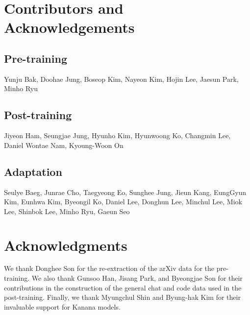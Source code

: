 \clearpage

\let\oldthefootnote\thefootnote
\renewcommand{\thefootnote}{}
\renewcommand{\thefootnote}{\fnsymbol{footnote}}

\section*{Contributors and Acknowledgements}

\subsection*{Pre-training}

Yunju Bak, Doohae Jung, Boseop Kim\footnotemark[2], Nayeon Kim, Hojin Lee, Jaesun Park,  Minho Ryu

\subsection*{Post-training}

Jiyeon Ham, Seungjae Jung, Hyunho Kim, Hyunwoong Ko, Changmin Lee, Daniel Wontae Nam\footnotemark[2], Kyoung-Woon On\footnotemark[2]\footnotemark[3]

\subsection*{Adaptation}

Seulye Baeg, Junrae Cho, Taegyeong Eo, Sunghee Jung, Jieun Kang, EungGyun Kim\footnotemark[2], Eunhwa Kim, Byeongil Ko, Daniel Lee, Donghun Lee, Minchul Lee, Miok Lee, Shinbok Lee, Minho Ryu, Gaeun Seo



\section*{Acknowledgments}
We thank Donghee Son for the re-extraction of the arXiv data for the pre-training. 
We also thank Gunsoo Han, Jisang Park, and Byeongjae Son for their contributions in the construction of the general chat and code data used in the post-training. 
Finally, we thank Myungchul Shin and Byung-hak Kim for their invaluable support for Kanana models.

\renewcommand{\thefootnote}{\oldthefootnote}
